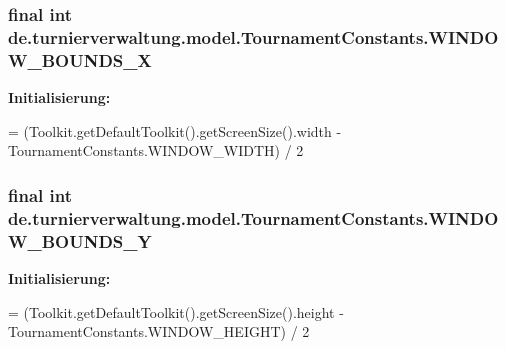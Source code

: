 \subsubsection[{\texorpdfstring{W\+I\+N\+D\+O\+W\+\_\+\+B\+O\+U\+N\+D\+S\+\_\+X}{WINDOW_BOUNDS_X}}]{\setlength{\rightskip}{0pt plus 5cm}final int de.\+turnierverwaltung.\+model.\+Tournament\+Constants.\+W\+I\+N\+D\+O\+W\+\_\+\+B\+O\+U\+N\+D\+S\+\_\+X\hspace{0.3cm}{\ttfamily [static]}}\hypertarget{classde_1_1turnierverwaltung_1_1model_1_1_tournament_constants_a9f680a539f0272876fab23253c57bcb9}{}\label{classde_1_1turnierverwaltung_1_1model_1_1_tournament_constants_a9f680a539f0272876fab23253c57bcb9}
{\bfseries Initialisierung\+:}
\begin{DoxyCode}
= (Toolkit.getDefaultToolkit().getScreenSize().width
            - TournamentConstants.WINDOW\_WIDTH) / 2
\end{DoxyCode}
\subsubsection[{\texorpdfstring{W\+I\+N\+D\+O\+W\+\_\+\+B\+O\+U\+N\+D\+S\+\_\+Y}{WINDOW_BOUNDS_Y}}]{\setlength{\rightskip}{0pt plus 5cm}final int de.\+turnierverwaltung.\+model.\+Tournament\+Constants.\+W\+I\+N\+D\+O\+W\+\_\+\+B\+O\+U\+N\+D\+S\+\_\+Y\hspace{0.3cm}{\ttfamily [static]}}\hypertarget{classde_1_1turnierverwaltung_1_1model_1_1_tournament_constants_a9b125c015d3671146dd283fdfa94102d}{}\label{classde_1_1turnierverwaltung_1_1model_1_1_tournament_constants_a9b125c015d3671146dd283fdfa94102d}
{\bfseries Initialisierung\+:}
\begin{DoxyCode}
= (Toolkit.getDefaultToolkit().getScreenSize().height
            - TournamentConstants.WINDOW\_HEIGHT) / 2
\end{DoxyCode}

